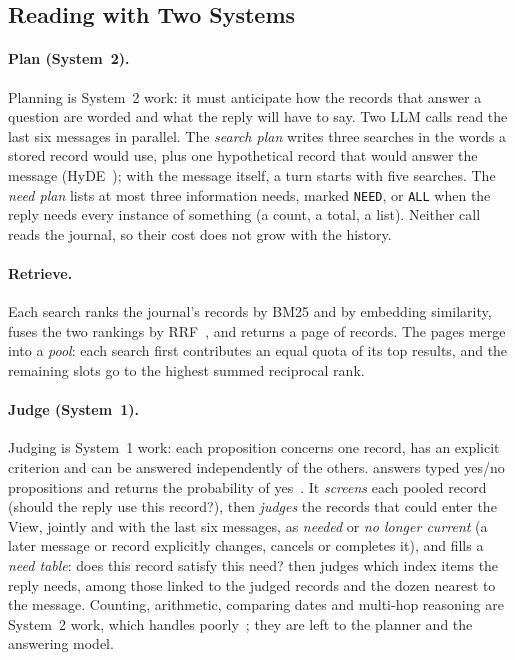 \subsection{Reading with Two Systems}
\label{sec:read}

\paragraph{Plan (System~2).}
Planning is System~2 work: it must anticipate how the records that answer a question are worded and what the reply will have to say.
Two LLM calls read the last six messages in parallel.
The \emph{search plan} writes three searches in the words a stored record would use, plus one hypothetical record that would answer the message (HyDE~\citep{gao2023hyde}); with the message itself, a turn starts with five searches.
The \emph{need plan} lists at most three information needs, marked \texttt{NEED}, or \texttt{ALL} when the reply needs every instance of something (a count, a total, a list).
Neither call reads the journal, so their cost does not grow with the history.

\paragraph{Retrieve.}
Each search ranks the journal's records by BM25 and by embedding similarity, fuses the two rankings by RRF~\citep{cormack2009rrf}, and returns a page of records.
The pages merge into a \emph{pool}: each search first contributes an equal quota of its top results, and the remaining slots go to the highest summed reciprocal rank.

\paragraph{Judge (System~1).}
Judging is System~1 work: each proposition concerns one record, has an explicit criterion and can be answered independently of the others.
\jev{} answers typed yes/no propositions and returns the probability of yes~\citep{jev2026}.
It \emph{screens} each pooled record (should the reply use this record?), then \emph{judges} the records that could enter the View, jointly and with the last six messages, as \emph{needed} or \emph{no longer current} (a later message or record explicitly changes, cancels or completes it), and fills a \emph{need table}: does this record satisfy this need?
\jev{} then judges which index items the reply needs, among those linked to the judged records and the dozen nearest to the message.
Counting, arithmetic, comparing dates and multi-hop reasoning are System~2 work, which \jev{} handles poorly~\citep{jevdocs2026}; they are left to the planner and the answering model.

